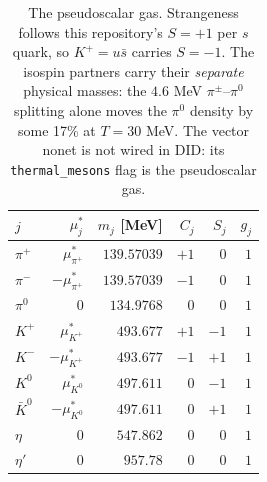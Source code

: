 \documentclass[aps,prc,onecolumn,superscriptaddress,nofootinbib,10pt]{revtex4-2}
\begin{document}
\begin{table}[h]
\centering
\begin{tabular}{lrrrrr}
\toprule
$j$ & $\mu^*_j$ & $m_j$ [MeV] & $C_j$ & $S_j$ & $g_j$ \\
\midrule
$\pi^+$      & $\mu^*_{\pi^+}$   & $139.57039$ & $+1$ & $0$  & $1$ \\
$\pi^-$      & $-\mu^*_{\pi^+}$  & $139.57039$ & $-1$ & $0$  & $1$ \\
$\pi^0$      & $0$               & $134.9768$  & $0$  & $0$  & $1$ \\
$K^+$        & $\mu^*_{K^+}$     & $493.677$   & $+1$ & $-1$ & $1$ \\
$K^-$        & $-\mu^*_{K^+}$    & $493.677$   & $-1$ & $+1$ & $1$ \\
$K^0$        & $\mu^*_{K^0}$     & $497.611$   & $0$  & $-1$ & $1$ \\
$\bar{K}^0$  & $-\mu^*_{K^0}$    & $497.611$   & $0$  & $+1$ & $1$ \\
$\eta$       & $0$               & $547.862$   & $0$  & $0$  & $1$ \\
$\eta'$      & $0$               & $957.78$    & $0$  & $0$  & $1$ \\
\bottomrule
\end{tabular}
\caption{The pseudoscalar gas. Strangeness follows this repository's
$S = +1$ per $s$ quark, so $K^+ = u\bar{s}$ carries $S = -1$. The isospin
partners carry their \emph{separate} physical masses: the $4.6$ MeV
$\pi^{\pm}$--$\pi^0$ splitting alone moves the $\pi^0$ density by some 17\% at
$T = 30$ MeV. The vector nonet is not wired in DID: its \texttt{thermal\_mesons}
flag is the pseudoscalar gas.}
\end{table}
\end{document}
